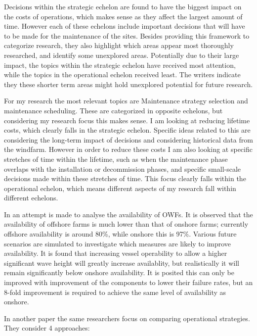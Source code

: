 \documentclass[a4paper,12pt]{article}
\begin{document}
Decisions within the strategic echelon are found to have the biggest impact on the costs of operations, which makes sense as they affect the largest amount of time. However each of these echelons include important decisions that will have to be made for the maintenance of the sites. Besides providing this framework to categorize research, they also highlight which areas appear most thoroughly researched, and identify some unexplored areas. Potentially due to their large impact, the topics within the strategic echelon have received most attention, while the topics in the operational echelon received least. The writers indicate they these shorter term areas might hold unexplored potential for future research. 

For my research the most relevant topics are Maintenance strategy selection and maintenance scheduling. These are categorized in opposite echelons, but considering my research focus this makes sense. I am looking at reducing lifetime costs, which clearly falls in the strategic echelon. Specific ideas related to this are considering the long-term impact of decisions and considering historical data from the windfarm. However in order to reduce these costs I am also looking at specific stretches of time within the lifetime, such as when the maintenance phase overlaps with the installation or decommission phases, and specific small-scale decisions made within these stretches of time. This focus clearly falls within the operational echelon, which means different aspects of my research fall within different echelons. 

\bigskip

In \cite{dinwoodie2012analysis} an attempt is made to analyse the availability of OWFs. It is observed that the availability of offshore farms is much lower than that of onshore farms; currently offshore availability is around 80\%, while onshore this is 97\%. Various future scenarios are simulated to investigate which measures are likely to improve availability. It is found that increasing vessel operability to allow a higher significant wave height will greatly increase availablity, but realistically it will remain significantly below onshore availability. It is posited this can only be improved with improvement of the components to lower their failure rates, but an 8-fold improvement is required to achieve the same level of availability as onshore. 

In another paper \cite{dinwoodie2014operational} the same researchers focus on comparing operational strategies. They consider 4 approaches: 
\end{document}
